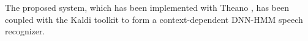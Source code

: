 \documentclass{article}
\begin{document}
The proposed system, which has been implemented with Theano \cite{theano}, %
has been coupled with the Kaldi toolkit \cite{kaldi} to form a context-dependent DNN-HMM speech recognizer.



\end{document}
